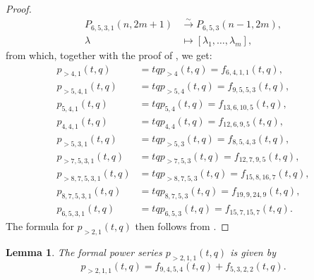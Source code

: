 \documentclass[a4paper, 12pt, reqno]{amsart}
\newtheorem{lemma}[theorem]{Lemma}
\theoremstyle{remark}
\begin{document}
\begin{proof}
  \begin{align*}
    P_{6, 5, 3, 1}(n, 2m + 1) &\xrightarrow{\sim} P_{6, 5, 3}(n - 1, 2m), \\
    \lambda &\mapsto [\lambda_1, \dots, \lambda_m],
  \end{align*}
  from which, together with the proof of , we get:
  \begin{align*}
    p_{>4, 1}(t, q) &= tqp_{>4}(t, q) = f_{6, 4, 1, 1}(t, q), \\
    p_{>5, 4, 1}(t, q) &= tqp_{>5, 4}(t, q) = f_{9, 5, 5, 3}(t, q), \\
    p_{5, 4, 1}(t, q) &= tqp_{5, 4}(t, q) = f_{13, 6, 10, 5}(t, q), \\
    p_{4, 4, 1}(t, q) &= tqp_{4, 4}(t, q) = f_{12, 6, 9, 5}(t, q), \\
    p_{>5, 3, 1}(t, q) &= tqp_{>5, 3}(t, q) = f_{8, 5, 4, 3}(t, q), \\
    p_{>7, 5, 3, 1}(t, q) &= tqp_{>7, 5, 3}(t, q) = f_{12, 7, 9, 5}(t, q), \\
    p_{>8, 7, 5, 3, 1}(t, q) &= tqp_{>8, 7, 5, 3}(t, q) = f_{15, 8, 16, 7}(t, q), \\
    p_{8, 7, 5, 3, 1}(t, q) &= tqp_{8, 7, 5, 3}(t, q) = f_{19, 9, 24, 9}(t, q), \\
    p_{6, 5, 3, 1}(t, q) &= tqp_{6, 5, 3}(t, q) = f_{15, 7, 15, 7}(t, q).
  \end{align*}
  The formula for $p_{>2, 1}(t, q)$ then follows from .
\end{proof}

\begin{lemma}
  \label{lmm:43}
  The formal power series $p_{>2, 1, 1}(t, q)$ is given by
  \begin{equation*}
    p_{>2, 1, 1}(t, q) = f_{9, 4, 5, 4}(t, q) + f_{5, 3, 2, 2}(t, q).
  \end{equation*}
\end{lemma}
\end{document}
